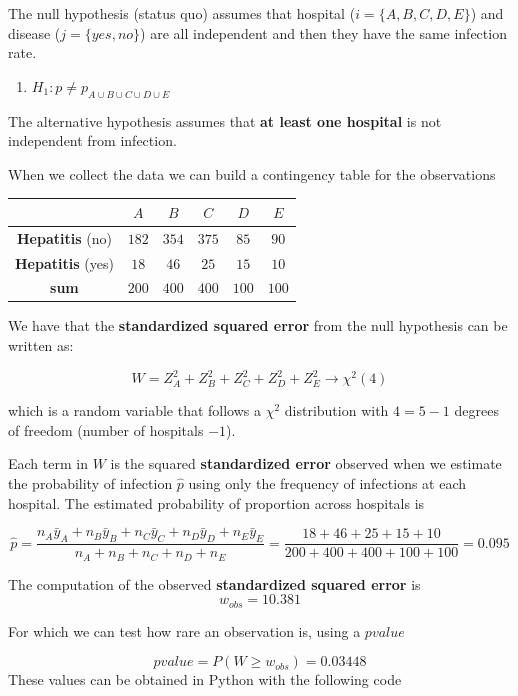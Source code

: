 \documentclass[
]{book}
\providecommand{\tightlist}{%
  \setlength{\itemsep}{0pt}\setlength{\parskip}{0pt}}
\begin{document}
The null hypothesis (status quo) assumes that hospital (\(i=\{A,B,C,D,E\}\)) and disease (\(j=\{yes, no\}\)) are all independent and then they have the same infection rate.

\begin{enumerate}
\def\labelenumi{\alph{enumi}.}
\setcounter{enumi}{1}
\tightlist
\item
  \(H_1: p\neq p_{A\cup B \cup C \cup D \cup E}\)
\end{enumerate}

The alternative hypothesis assumes that \textbf{at least one hospital} is not independent from infection.

When we collect the data we can build a contingency table for the observations

\begin{longtable}[]{@{}cccccc@{}}
\toprule\noalign{}
& \(A\) & \(B\) & \(C\) & \(D\) & \(E\) \\
\midrule\noalign{}
\endhead
\bottomrule\noalign{}
\endlastfoot
\textbf{Hepatitis} (no) & \(182\) & \(354\) & \(375\) & \(85\) & \(90\) \\
\textbf{Hepatitis} (yes) & \(18\) & \(46\) & \(25\) & \(15\) & \(10\) \\
\textbf{sum} & \(200\) & \(400\) & \(400\) & \(100\) & \(100\) \\
\end{longtable}

We have that the \textbf{standardized squared error} from the null hypothesis can be written as:

\[W= Z_A^2+Z_B^2+Z_C^2+Z_D^2+Z_E^2\rightarrow \chi^2(4)\]

which is a random variable that follows a \(\chi^2\) distribution with \(4=5-1\) degrees of freedom (number of hospitals \(-1\)).

Each term in \(W\) is the squared \textbf{standardized error} observed when we estimate the probability of infection \(\hat{p}\) using only the frequency of infections at each hospital. The estimated probability of proportion across hospitals is

\[\hat{p}=\frac{n_A\bar{y}_A+n_B\bar{y}_B+n_C\bar{y}_C+n_D\bar{y}_D+n_E\bar{y}_E}{n_A+n_B+n_C+n_D+n_E}=\frac{18+46+25+15+10}{200+400+400+100+100}=0.095\]

The computation of the observed \textbf{standardized squared error} is
\[w_{obs}=10.381\]

For which we can test how rare an observation is, using a \(pvalue\)

\[pvalue=P(W \geq w_{obs}) = 0.03448\]
These values can be obtained in Python with the following code
\end{document}
